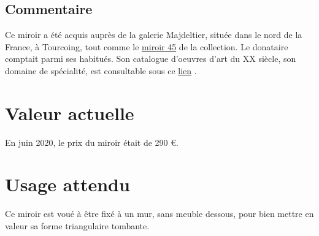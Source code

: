     \subsection* {Commentaire}
     Ce miroir a été acquis auprès de la galerie Majdeltier, située dans le nord de la
                France, à Tourcoing, tout comme le 
    \href{miroir45.xml}{miroir
                    45}
   de la collection. Le donataire comptait parmi ses habitués. Son
                catalogue d'oeuvres d'art du XX
    {}
   siècle, son domaine de spécialité, est consultable
                sous ce 
    \href{https://www.proantic.com/galerie/majdeltier/}{lien}
  . 
    \section* {Valeur actuelle}
    En juin 2020, le prix du miroir était de 290 €.
    \section* {Usage attendu}
     Ce miroir est voué à être fixé à un mur, sans meuble dessous, pour bien mettre en valeur
            sa forme triangulaire tombante.   
  